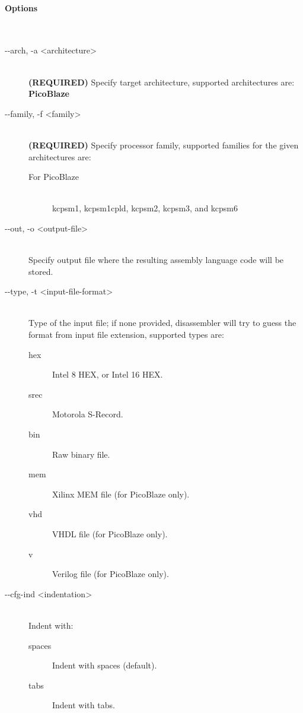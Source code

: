     \paragraph{Options}~\\
        \begin{description}
            \item[-{}-arch, -a <architecture>]~\\
                \textbf{(REQUIRED)} Specify target architecture, supported architectures are: \textbf{PicoBlaze}

            \item[-{}-family, -f <family>]~\\
                \textbf{(REQUIRED)} Specify processor family, supported families for the given architectures are:
                \begin{description}
                    \item[For PicoBlaze]~\\
                        kcpsm1, kcpsm1cpld, kcpsm2, kcpsm3, and kcpsm6
                \end{description}

            \item[-{}-out, -o <output-file>]~\\
                Specify output file where the resulting assembly language code will be stored.

            \item[-{}-type, -t <input-file-format>]~\\
                Type of the input file; if none provided, disassembler will try to guess the format from input file extension, supported types are:
                \begin{description}
                    \item [hex] Intel 8 HEX, or Intel 16 HEX.
                    \item [srec] Motorola S-Record.
                    \item [bin] Raw binary file.
                    \item [mem] Xilinx MEM file (for PicoBlaze only).
                    \item [vhd] VHDL file (for PicoBlaze only).
                    \item [v] Verilog file (for PicoBlaze only).
                \end{description}

            \item[-{}-cfg-ind <indentation>]~\\
                Indent with:
                \begin{description}
                    \item [spaces] Indent with spaces (default).
                    \item [tabs] Indent with tabs.
                \end{description}


\end{description}
